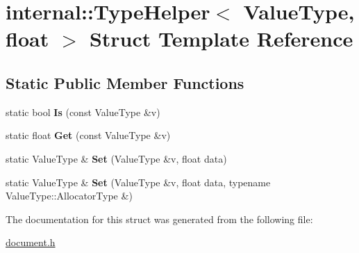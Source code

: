 \hypertarget{a00314}{}\section{internal\+:\+:Type\+Helper$<$ Value\+Type, float $>$ Struct Template Reference}
\label{a00314}
\subsection*{Static Public Member Functions}
\begin{DoxyCompactItemize}
\item 
static bool {\bfseries Is} (const Value\+Type \&v)\hypertarget{a00314_a1108488a02868bb91c3c14f4598bbebc}{}\label{a00314_a1108488a02868bb91c3c14f4598bbebc}

\item 
static float {\bfseries Get} (const Value\+Type \&v)\hypertarget{a00314_aa681e0d25878a7a770b0be82322b435a}{}\label{a00314_aa681e0d25878a7a770b0be82322b435a}

\item 
static Value\+Type \& {\bfseries Set} (Value\+Type \&v, float data)\hypertarget{a00314_a28318c2063421cf18dfa23d16352a3b8}{}\label{a00314_a28318c2063421cf18dfa23d16352a3b8}

\item 
static Value\+Type \& {\bfseries Set} (Value\+Type \&v, float data, typename Value\+Type\+::\+Allocator\+Type \&)\hypertarget{a00314_a3a0d8783f6228504058c427a16687bdf}{}\label{a00314_a3a0d8783f6228504058c427a16687bdf}

\end{DoxyCompactItemize}


The documentation for this struct was generated from the following file\+:\begin{DoxyCompactItemize}
\item 
\hyperlink{a00473}{document.\+h}\end{DoxyCompactItemize}
